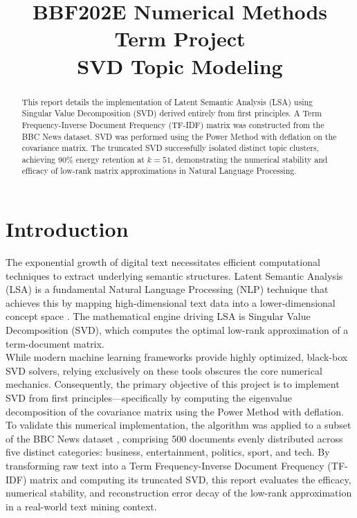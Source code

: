 \documentclass[conference]{IEEEtran}
\begin{document}
\title{BBF202E Numerical Methods\\
Term Project\\
SVD Topic Modeling}

\author{
}

\maketitle

\begin{abstract}
This report details the implementation of Latent Semantic Analysis (LSA) using Singular Value Decomposition (SVD) derived entirely from first principles. A Term Frequency-Inverse Document Frequency (TF-IDF) matrix was constructed from the BBC News dataset. SVD was performed using the Power Method with deflation on the covariance matrix. The truncated SVD successfully isolated distinct topic clusters, achieving 90\% energy retention at $k=51$, demonstrating the numerical stability and efficacy of low-rank matrix approximations in Natural Language Processing.
\end{abstract}

\section{Introduction}
The exponential growth of digital text necessitates efficient computational techniques to extract underlying semantic structures. Latent Semantic Analysis (LSA) is a fundamental Natural Language Processing (NLP) technique that achieves this by mapping high-dimensional text data into a lower-dimensional concept space \cite{b3}. The mathematical engine driving LSA is Singular Value Decomposition (SVD), which computes the optimal low-rank approximation of a term-document matrix.
\\
While modern machine learning frameworks provide highly optimized, black-box SVD solvers, relying exclusively on these tools obscures the core numerical mechanics. Consequently, the primary objective of this project is to implement SVD from first principles—specifically by computing the eigenvalue decomposition of the covariance matrix using the Power Method with deflation.
\\
To validate this numerical implementation, the algorithm was applied to a subset of the BBC News dataset \cite{b4}, comprising 500 documents evenly distributed across five distinct categories: business, entertainment, politics, sport, and tech. By transforming raw text into a Term Frequency-Inverse Document Frequency (TF-IDF) matrix and computing its truncated SVD, this report evaluates the efficacy, numerical stability, and reconstruction error decay of the low-rank approximation in a real-world text mining context.
\end{document}
